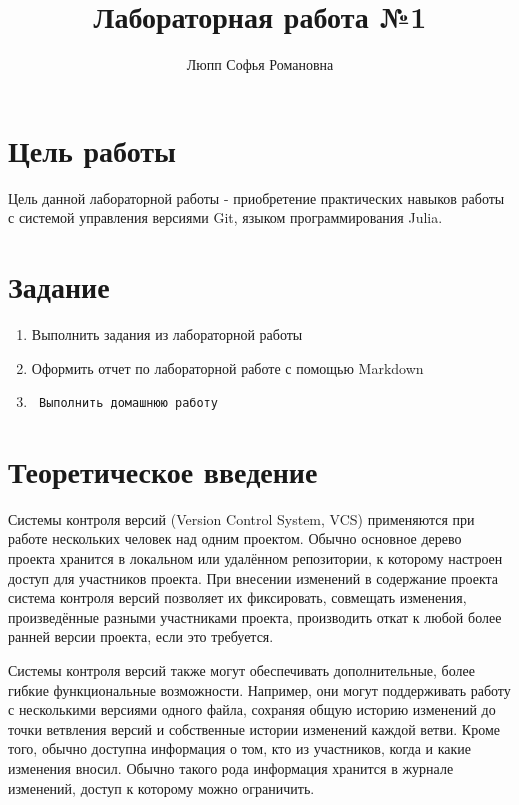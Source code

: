 \documentclass[
  english,
  russian,
  12pt,
  a4paper,
  DIV=11,
  numbers=noendperiod]{scrreprt}
\title{Лабораторная работа №1}
\author{Люпп Софья Романовна}
\date{}
\renewcommand*\contentsname{Содержание}
\newcommand\contentsname{Содержание}
\begin{document}
\maketitle

\renewcommand*\contentsname{Содержание}
{
\setcounter{tocdepth}{1}
\tableofcontents
}
\listoffigures
\listoftables

\chapter{Цель
работы}\label{ux446ux435ux43bux44c-ux440ux430ux431ux43eux442ux44b}

Цель данной лабораторной работы - приобретение практических навыков
работы с системой управления версиями Git, языком программирования
Julia.

\chapter{Задание}\label{ux437ux430ux434ux430ux43dux438ux435}

\begin{enumerate}
\def\labelenumi{\arabic{enumi}.}
\item
  Выполнить задания из лабораторной работы
\item
  Оформить отчет по лабораторной работе с помощью Markdown
\item
\begin{verbatim}
 Выполнить домашнюю работу
\end{verbatim}
\end{enumerate}

\chapter{Теоретическое
введение}\label{ux442ux435ux43eux440ux435ux442ux438ux447ux435ux441ux43aux43eux435-ux432ux432ux435ux434ux435ux43dux438ux435}

Системы контроля версий (Version Control System, VCS) применяются при
работе нескольких человек над одним проектом. Обычно основное дерево
проекта хранится в локальном или удалённом репозитории, к которому
настроен доступ для участников проекта. При внесении изменений в
содержание проекта система контроля версий позволяет их фиксировать,
совмещать изменения, произведённые разными участниками проекта,
производить откат к любой более ранней версии проекта, если это
требуется.

Системы контроля версий также могут обеспечивать дополнительные, более
гибкие функциональные возможности. Например, они могут поддерживать
работу с несколькими версиями одного файла, сохраняя общую историю
изменений до точки ветвления версий и собственные истории изменений
каждой ветви. Кроме того, обычно доступна информация о том, кто из
участников, когда и какие изменения вносил. Обычно такого рода
информация хранится в журнале изменений, доступ к которому можно
ограничить.
\end{document}
